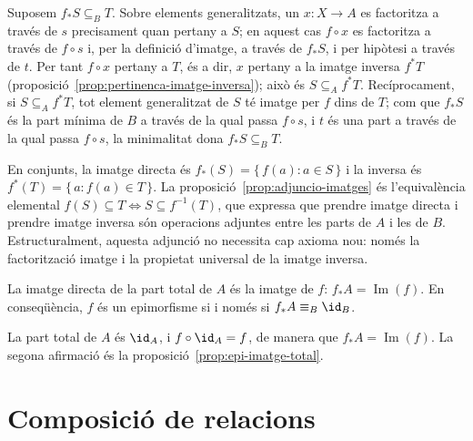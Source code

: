 \begin{prova}
Suposem \(f_{*}S\subseteq_B T\). Sobre elements generalitzats, un
\(x\colon X\to A\) es factoritza a través de \(s\) precisament quan
pertany a \(S\); en aquest cas \(f\circ x\) es factoritza a través de
\(f\circ s\) i, per la definició d'imatge, a través de \(f_{*}S\), i per
hipòtesi a través de \(t\). Per tant \(f\circ x\) pertany a \(T\), és a
dir, \(x\) pertany a la imatge inversa \(f^{*}T\)
(proposició~\ref{prop:pertinenca-imatge-inversa}); això és \(S\subseteq_A
f^{*}T\). Recíprocament, si \(S\subseteq_A f^{*}T\), tot element
generalitzat de \(S\) té imatge per \(f\) dins de \(T\); com que
\(f_{*}S\) és la part mínima de \(B\) a través de la qual passa \(f\circ
s\), i \(t\) és una part a través de la qual passa \(f\circ s\), la
minimalitat dona \(f_{*}S\subseteq_B T\).
\end{prova}

\begin{observacio}\label{obs:imatge-directa-classica}
En conjunts, la imatge directa és \(f_{*}(S)=\{\,f(a):a\in S\,\}\) i la
inversa és \(f^{*}(T)=\{\,a:f(a)\in T\,\}\). La
proposició~\ref{prop:adjuncio-imatges} és l'equivalència elemental
\(f(S)\subseteq T\iff S\subseteq f^{-1}(T)\), que expressa que prendre
imatge directa i prendre imatge inversa són operacions adjuntes entre les
parts de \(A\) i les de \(B\). Estructuralment, aquesta adjunció no
necessita cap axioma nou: només la factorització imatge i la propietat
universal de la imatge inversa.
\end{observacio}

\begin{corollari}\label{cor:estabilitat-exhaustiva}
La imatge directa de la part total de \(A\) és la imatge de \(f\):
\(f_{*}A=\operatorname{Im}(f)\). En conseqüència, \(f\) és un epimorfisme
si i només si \(f_{*}A\equiv_B\id_B\).
\end{corollari}

\begin{prova}
La part total de \(A\) és \(\id_A\), i \(f\circ\id_A=f\), de manera que
\(f_{*}A=\operatorname{Im}(f)\). La segona afirmació és la
proposició~\ref{prop:epi-imatge-total}.
\end{prova}

\section{Composició de relacions}\label{sec:composicio-relacions}

